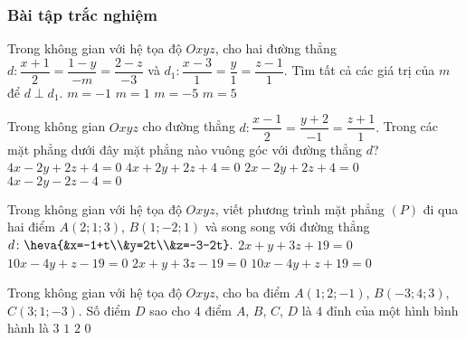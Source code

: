 	\subsubsection{Bài tập trắc nghiệm}
	\setcounter{ex}{0}
	\begin{ex}%
	Trong không gian với hệ tọa độ $Oxyz$, cho hai đường thẳng $d:\dfrac{x+1}{2}=\dfrac{1-y}{-m}=\dfrac{2-z}{-3}$ và $d_{1}:\dfrac{x-3}{1}=\dfrac{y}{1}=\dfrac{z-1}{1}$. Tìm tất cả các giá trị của $m$ để $d\perp d_{1}$.
	\choice
	{$m=-1$}
	{$m=1$}
	{\True $m=-5$}
	{$m=5$}
	\end{ex}
	\begin{ex}%
	Trong không gian $Oxyz$ cho đường thẳng $d\colon \dfrac{x-1}{2}=\dfrac{y+2}{-1}=\dfrac{z+1}{1}.$ Trong các mặt phẳng dưới đây mặt phẳng nào vuông góc với đường thẳng $d$?
	\choice
	{\True $4x-2y+2z+4=0$}
	{$4x+2y+2z+4=0$}
	{$2x-2y+2z+4=0$}
	{$4x-2y-2z-4=0$}
	\end{ex}
	\begin{ex}%
	Trong không gian với hệ tọa độ $Oxyz$, viết phương trình mặt phẳng $(P)$ đi qua hai điểm $A(2;1;3)$, $B(1;-2;1)$ và song song với đường thẳng $d\colon \heva{&x=-1+t\\&y=2t\\&z=-3-2t}.$
	\choice
	{$2x+y+3z+19=0$}
	{\True $10x-4y+z-19=0$}
	{$2x+y+3z-19=0$}
	{$10x-4y+z+19=0$}
	\end{ex}
	\begin{ex} %
	Trong không gian với hệ tọa độ $Oxyz$, cho ba điểm $A(1; 2; -1)$, $B(-3; 4; 3)$, $C(3; 1; -3)$. Số điểm $D$ sao cho $4$ điểm $A$, $B$, $C$, $D$ là $4$ đỉnh của một hình bình hành là
	\choice
	{$3$}
	{$1$}
	{$2$}
	{\True $0$}
	\end{ex}
